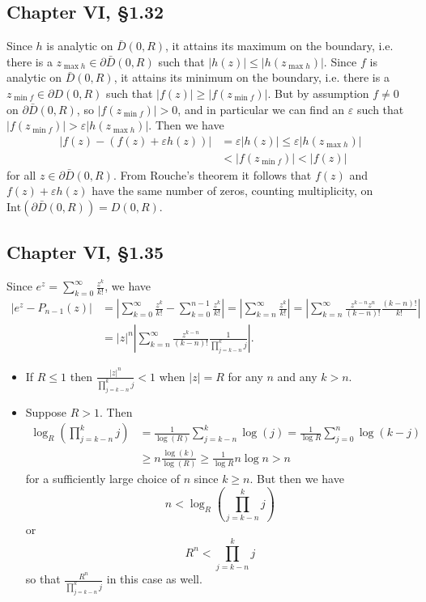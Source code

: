 \documentclass{article}
\begin{document}
\subsection*{Chapter VI, \S1.32}
Since $h$ is analytic on $\bar{D}(0, R)$, it attains its maximum on
the boundary, i.e. there is a $z_{\max h} \in \partial \bar{D} (0, R)$
such that $|h(z)| \leq |h(z_{\max h})|$. Since $f$ is analytic on $\bar{D}(0, R)$,
it attains its minimum on the boundary, i.e. there is a 
$z_{\min f} \in \partial D(0, R)$ such that $|f(z)| \geq |f(z_{\min f})|$. But by 
assumption $f \neq 0$ on $\partial \bar{D}(0, R)$, so 
$|f(z_{\min f})| > 0$, and in particular we can find an $\varepsilon$ 
such that $|f(z_{\min f})| > \varepsilon |h(z_{\max h})|$. Then
we have
\begin{align*}
      |f(z) - (f(z) + \varepsilon h(z))| 
&=    \varepsilon |h(z)| 
\leq  \varepsilon |h(z_{\max h})| \\
&<     |f(z_{\min f})|
 <     |f(z)|
\end{align*}
for all $z \in \partial \bar{D}(0, R)$. From Rouche's theorem it follows that
$f(z)$ and $f(z) + \varepsilon h(z)$ have the same number of zeros, counting
multiplicity, on 
$\mathrm{Int}(\partial\bar{D}(0, R)) = D(0, R)$.

\subsection*{Chapter VI, \S1.35}
Since $e^z = \sum_{k=0}^\infty \frac{z^k}{k!}$, we have
\begin{align*}
   \left|e^z - P_{n-1}(z)\right|
&= \left|
     \sum_{k=0}^\infty \frac{z^k}{k!}
   - \sum_{k=0}^{n-1} \frac{z^k}{k!}
   \right|
 = \left|
     \sum_{k=n}^\infty 
       \frac{z^k}{k!}
   \right|
 = \left|
     \sum_{k=n}^\infty 
       \frac{z^{k-n} z^n}
            {(k-n)!}
       \frac{(k-n)!}{k!}
   \right| \\
&= |z|^n
   \left|
     \sum_{k=n}^\infty 
       \frac{z^{k-n}}
            {(k-n)!}
       \frac{1}{\prod_{j=k-n}^k j}
   \right|.
\end{align*}

\begin{itemize}
  \item{
    If $R \leq 1$ then
    $\frac{|z|^n}{\prod_{j=k-n}^k j} < 1$ when $|z| = R$
    for any $n$ and any $k > n$.
  }
  \item{
     Suppose $R > 1$. Then
     \begin{align*}
           \log_R \left(
             \prod_{j=k-n}^k j
           \right)
     &=    \frac{1}{\log(R)}
           \sum_{j=k-n}^k 
             \log(j)
      =    \frac{1}{\log R}
           \sum_{j=0}^n
             \log(k - j) \\
     &\geq n \frac{\log(k)}{\log (R)}
      \geq \frac{1}{\log R} n \log n
      >    n
     \end{align*}
     for a sufficiently large choice of $n$ since $k \geq n$.
     But then we have
     $$
       n 
     < \log_R \left(
         \prod_{j=k-n}^k j
       \right)
     $$
     or
     $$
       R^n
     < \prod_{j=k-n}^k j
     $$
     so that $\frac{R^n}{\prod_{j=k-n}^k j}$ in this case as well.
  }
\end{itemize}
\end{document}

